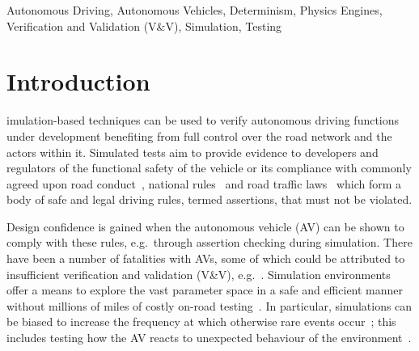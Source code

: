 \documentclass[letterpaper, 10 pt, journal, twoside]{IEEEtran}
\begin{document}
\begin{abstract}
\end{abstract}

\begin{IEEEkeywords}
Autonomous Driving, Autonomous Vehicles, Determinism, Physics Engines,  Verification and Validation (V\&V), Simulation, Testing
\end{IEEEkeywords}
\IEEEpeerreviewmaketitle

\section{Introduction} \label{s:introduction}
%
imulation-based techniques can be used to verify autonomous driving functions under development benefiting from full control over the road network and the actors within it. Simulated tests aim to provide evidence to developers and regulators of the functional safety of the vehicle or its compliance with commonly agreed upon road conduct~\cite{ViennaConv}, national rules~\cite{codes2015highway} and road traffic laws~\cite{RoadTraffic1988} which form a body of safe and legal driving rules, termed assertions, that must not be violated. 

Design confidence is gained when the autonomous vehicle (AV) can be shown to comply with these rules, e.g.\ through assertion checking during simulation. 
There have been a number of fatalities with AVs, some of which could be attributed to insufficient verification and validation (V\&V), e.g.~\cite{FatalityExample}. Simulation environments offer a means to explore the vast parameter space in a safe and efficient manner~\cite{korosec2019waymo} without millions of miles of costly on-road testing~\cite{kalra2016driving}. In particular, simulations can be biased to increase the frequency at which otherwise rare events occur~\cite{Koopman2018}; this includes testing how the AV reacts to unexpected behaviour of the environment~\cite{RobustnessAutonomy}. 
\end{document}
